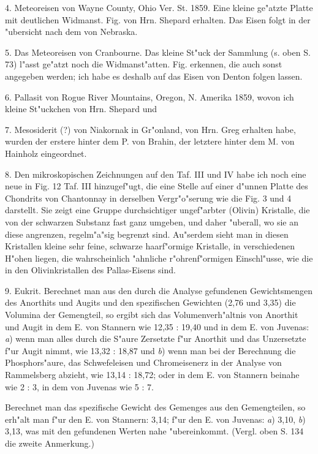 \documentclass[a4paper, 11pt, oneside, german]{article}
\begin{document}
4. Meteoreisen von Wayne County, Ohio Ver. St. 1859. Eine kleine ge"atzte Platte mit deutlichen Widmanst. Fig. von Hrn. Shepard erhalten. Das Eisen folgt in der "ubersicht nach dem von Nebraska.

5. Das Meteoreisen von Cranbourne. Das kleine St"uck der Sammlung (s. oben S. 73) l"asst ge"atzt noch die Widmanst"atten. Fig. erkennen, die auch sonst angegeben werden; ich habe es deshalb auf das Eisen von Denton folgen lassen.

6. Pallasit von Rogue River Mountains, Oregon, N. Amerika 1859, wovon ich kleine St"uckchen von Hrn. Shepard und

7. Mesosiderit (?) von Niakornak in Gr"onland, von Hrn. Greg erhalten habe, wurden der erstere hinter dem P. von Brahin, der letztere hinter dem M. von Hainholz eingeordnet.

8. Den mikroskopischen Zeichnungen auf den Taf. III und IV habe ich noch eine neue in Fig. 12 Taf. III hinzugef"ugt, die eine Stelle auf einer d"unnen Platte des Chondrits von Chantonnay in derselben Vergr"o"serung wie die Fig. 3 und 4 darstellt. Sie zeigt eine Gruppe durchsichtiger ungef"arbter (Olivin) Kristalle, die von der schwarzen Substanz fast ganz umgeben, und daher "uberall, wo sie an diese angrenzen, regelm"a"sig begrenzt sind. Au"serdem sieht man in diesen Kristallen kleine sehr feine, schwarze haarf"ormige Kristalle, in verschiedenen H"ohen liegen, die wahrscheinlich "ahnliche r"ohrenf"ormigen Einschl"usse, wie die in den Olivinkristallen des Pallas-Eisens sind.

9. Eukrit. Berechnet man aus den durch die Analyse gefundenen Gewichtsmengen des Anorthits und Augits und den spezifischen Gewichten (2,76 und 3,35) die Volumina der Gemengteil, so ergibt sich das Volumenverh"altnis von Anorthit und Augit in dem E. von Stannern wie 12,35 : 19,40 und in dem E. von Juvenas: \emph{a}) wenn man alles durch die S"aure Zersetzte f"ur Anorthit und das Unzersetzte f"ur Augit nimmt, wie 13,32 : 18,87 und \emph{b}) wenn man bei der Berechnung die Phosphors"aure, das Schwefeleisen und Chromeisenerz in der Analyse von Rammelsberg abzieht, wie 13,14 : 18,72; oder in dem E. von Stannern beinahe wie 2 : 3, in dem von Juvenas wie 5 : 7.

Berechnet man das spezifische Gewicht des Gemenges aus den Gemengteilen, so erh"alt man f"ur den E. von Stannern: 3,14; f"ur den E. von Juvenas: \emph{a}) 3,10, \emph{b}) 3,13, was mit den gefundenen Werten nahe "ubereinkommt. (Vergl. oben S. 134 die zweite Anmerkung.)
\end{document}
